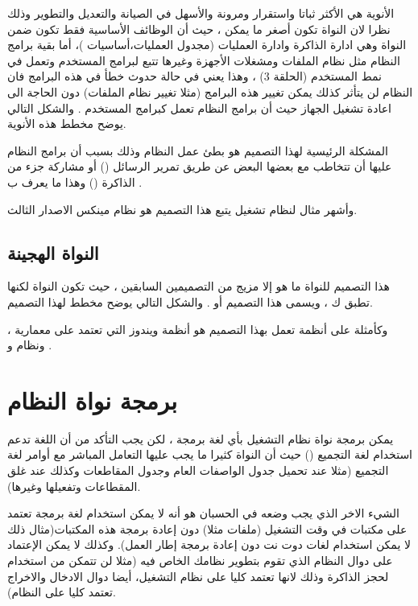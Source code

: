 \documentclass[document.tex]{subfiles}
\begin{document}
الأنوية  هي الأكثر ثباتا واستقرار ومرونة والأسهل في الصيانة والتعديل والتطوير وذلك نظرا لان النواة تكون أصغر ما يمكن ، حيث أن الوظائف الأساسية فقط تكون ضمن النواة وهي ادارة الذاكرة وادارة العمليات (مجدول العمليات،أساسيات )، أما بقية برامج النظام مثل نظام الملفات ومشغلات الأجهزة وغيرها تتبع لبرامج المستخدم وتعمل في نمط المستخدم (الحلقة 3) ، وهذا يعني في حالة حدوث خطأ في هذه البرامج فان النظام لن يتأثر كذلك يمكن تغيير هذه البرامج (مثلا تغيير نظام الملفات) دون الحاجة الى اعادة تشغيل الجهاز حيث أن برامج النظام تعمل كبرامج المستخدم . والشكل التالي يوضح مخطط هذه الأنوية.


المشكلة الرئيسية لهذا التصميم هو بطئ عمل النظام وذلك بسبب أن برامج النظام عليها أن تتخاطب مع بعضها البعض عن طريق تمرير الرسائل () أو مشاركة جزء من الذاكرة () وهذا ما يعرف ب .

وأشهر مثال لنظام تشغيل يتبع هذا التصميم هو نظام مينكس الاصدار الثالث.


\subsection{النواة الهجينة }
هذا التصميم للنواة ما هو إلا مزيج من التصميمين السابقين ، حيث تكون النواة  لكنها تطبق ك  ، ويسمى هذا التصميم  أو . والشكل التالي يوضح مخطط لهذا التصميم.


وكأمثلة على أنظمة تعمل بهذا التصميم هو أنظمة ويندوز التي تعتمد على معمارية  ، ونظام  و .



\section{برمجة نواة النظام}
يمكن برمجة نواة نظام التشغيل بأي لغة برمجة ، لكن يجب التأكد من أن اللغة تدعم استخدام لغة التجميع () حيث أن النواة كثيرا ما يجب عليها التعامل المباشر مع أوامر لغة التجميع (مثلا عند  تحميل جدول الواصفات العام وجدول المقاطعات وكذلك عند غلق المقطاعات وتفعيلها وغيرها).

الشيء الاخر الذي يجب وضعه في الحسبان هو أنه لا يمكن استخدام لغة برمجة تعتمد على مكتبات في وقت التشغيل (ملفات  مثلا) دون إعادة برمجة هذه المكتبات(مثال ذلك لا يمكن استخدام لغات دوت نت دون إعادة برمجة إطار العمل). وكذلك لا يمكن الإعتماد على دوال النظام الذي تقوم بتطوير نظامك الخاص فيه (مثلا لن تتمكن من استخدام  لحجز الذاكرة وذلك لانها تعتمد كليا على نظام التشغيل، أيضا دوال الادخال والاخراج تعتمد كليا على النظام).
\end{document}
